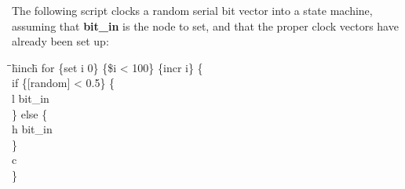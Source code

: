 \documentclass[letterpaper,twoside,12pt]{article}
\def\hinch{\hspace*{0.5in}}
\def\starti{\begin{center}\begin{tabbing}\hinch\=\hinch\=\hinch\=hinch\hinch\=\kill}
\def\endi{\end{tabbing}\end{center}}
\def\ih{\>\>}
\def\ii{\>\>\>}
\def\ij{\>\>\>\>}
\def\bstf{\bfseries\ttfamily}
\begin{document}
The following script clocks a random serial bit vector into a state machine,
assuming that {\bstf bit\_in} is the node to set, and that the proper clock
vectors have already been set up:
\starti
  \ih  for \{set i 0\} \{\$i < 100\} \{incr i\} \{ \\
  \ii 	  if \{[random] < 0.5\} \{ \\
  \ij	     l bit\_in \\
  \ii	  \} else \{ \\
  \ij	     h bit\_in \\
  \ii	  \} \\
  \ii 	  c \\
  \ih  \}
\endi
\end{document}
